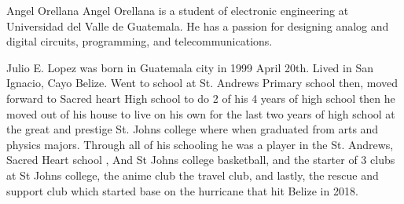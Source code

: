 \begin{IEEEbiography}{Angel Orellana}
Angel Orellana is a student of electronic engineering at Universidad del Valle 
de Guatemala. He has a passion for designing analog and digital circuits, 
programming, and telecommunications.
\end{IEEEbiography}
    
\begin{IEEEbiography}{Julio E. Lopez}
was born in Guatemala city in 1999 April 20th. Lived in San Ignacio, Cayo Belize. Went to school at
St. Andrews Primary school then, moved forward to Sacred heart High school to do 2 of
his 4 years of high school then he moved out of his house to live on his own for the last
two years of high school at the great and prestige St. Johns college where when graduated from
arts and physics majors. Through all of his schooling he was a player in the St. Andrews, Sacred Heart school , And St Johns
college basketball, and the starter of 3 clubs at St Johns college, the anime club the travel club, and lastly, the
rescue and support club which started base on the hurricane that hit Belize in 2018.
\end{IEEEbiography}